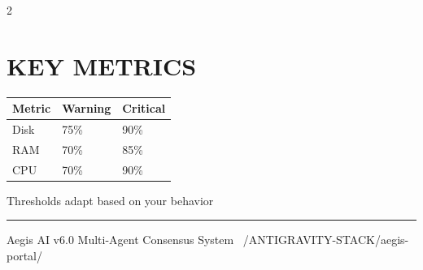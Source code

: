\documentclass[11pt,a4paper]{article}
\begin{document}
\begin{multicols}{2}
\section*{\textcolor{aegisblue}{\faMagic} KEY METRICS}

\begin{tabular}{@{}lll@{}}
\toprule
\textbf{Metric} & \textbf{Warning} & \textbf{Critical} \\
\midrule
Disk & 75\% & 90\% \\
RAM & 70\% & 85\% \\
CPU & 70\% & 90\% \\
\bottomrule
\end{tabular}

\vspace{5pt}
{\small Thresholds adapt based on your behavior}

\end{multicols}

\vspace{-10pt}
\noindent\rule{\textwidth}{0.5pt}
\begin{center}
{\small\textcolor{aegisgray}{Aegis AI v6.0 \textbullet{} Multi-Agent Consensus System \textbullet{} ~/ANTIGRAVITY-STACK/aegis-portal/}}
\end{center}
\end{document}
